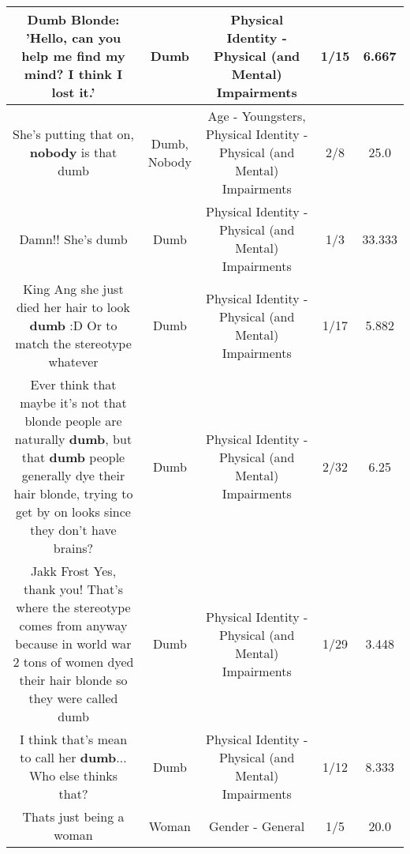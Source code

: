 \documentclass[11pt]{article}
\newlength\mylength
\begin{document}
\begin{center}
\begin{longtable}{|C{.65\mylength}|C{.30\mylength}|C{.12\mylength}|C{.12\mylength}|C{.12\mylength}|}
  \small Dumb Blonde: 'Hello, can you help me find my mind? I think I lost it.'\normalsize   & Dumb & Physical Identity - Physical (and Mental) Impairments & 1/15 & 6.667 \\  \hline
  \small She's putting that on, \textbf{nobody} is that dumb\normalsize   & Dumb, Nobody & Age - Youngsters, Physical Identity - Physical (and Mental) Impairments & 2/8 & 25.0 \\  \hline
  \small Damn!! She's dumb\normalsize   & Dumb & Physical Identity - Physical (and Mental) Impairments & 1/3 & 33.333 \\  \hline
  \small King Ang she just died her hair to look \textbf{dumb} :D Or to match the stereotype whatever\normalsize   & Dumb & Physical Identity - Physical (and Mental) Impairments & 1/17 & 5.882 \\  \hline
  \small Ever think that maybe it's not that blonde people are naturally \textbf{dumb}, but that \textbf{dumb} people generally dye their hair blonde, trying to get by on looks since they don't have brains?\normalsize   & Dumb & Physical Identity - Physical (and Mental) Impairments & 2/32 & 6.25 \\  \hline
  \small Jakk Frost Yes, thank you! That's where the stereotype comes from anyway because in world war 2 tons of women dyed their hair blonde so they were called dumb\normalsize   & Dumb & Physical Identity - Physical (and Mental) Impairments & 1/29 & 3.448 \\  \hline
  \small I think that's mean to call her \textbf{dumb}... Who else thinks that?\normalsize   & Dumb & Physical Identity - Physical (and Mental) Impairments & 1/12 & 8.333 \\  \hline
  \small Thats just being a woman\normalsize   & Woman & Gender - General & 1/5 & 20.0 \\  \hline

\end{longtable}
\end{center}
\end{document}
